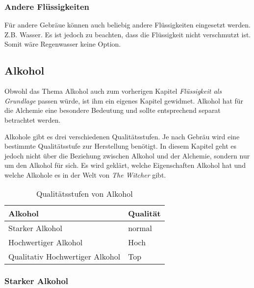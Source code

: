 \subsubsection{Andere Flüssigkeiten}
Für andere Gebräue können auch beliebig andere Flüssigkeiten eingesetzt werden. Z.B. Wasser. Es ist jedoch zu beachten, dass die Flüssigkeit nicht verschmutzt ist. Somit wäre Regenwasser keine Option. 

\subsection{Alkohol}
\label{chap:alkohol}
Obwohl das Thema Alkohol auch zum vorherigen Kapitel \textit{Flüssigkeit als Grundlage} passen würde, ist ihm ein eigenes Kapitel gewidmet. Alkohol hat für die Alchemie eine besondere Bedeutung und sollte entsprechend separat betrachtet werden.

Alkohole gibt es drei verschiedenen Qualitätsstufen. Je nach Gebräu wird eine bestimmte Qualitätsstufe zur Herstellung benötigt. In diesem Kapitel geht es jedoch nicht über die Beziehung zwischen Alkohol und der Alchemie, sondern nur um den Alkohol für sich. Es wird geklärt, welche Eigenschaften Alkohol hat und welche Alkohole es in der Welt von \textit{The Witcher} gibt.

\begin{table}[H]
\begin{center}
\begin{tabular}{|l|l|}
\hline
\textbf{Alkohol} & \textbf{Qualität} \\ \hline
Starker Alkohol & normal \\ \hline
Hochwertiger Alkohol & Hoch \\ \hline
Qualitativ Hochwertiger Alkohol & Top \\ \hline
\end{tabular}
\end{center}
\caption{Qualitätsstufen von Alkohol}
\label{tab:qualitaetsstufen_von_alkohol}
\end{table}

\subsubsection{Starker Alkohol}

